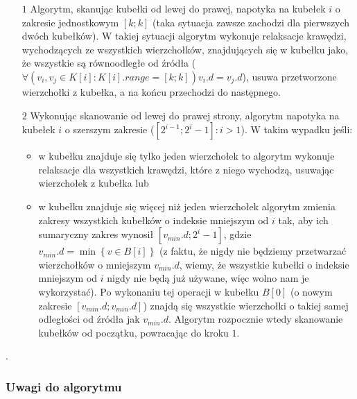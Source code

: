 \begin{itemize}
	\item[$1$] Algorytm, skanując kubełki od lewej do prawej, napotyka na kubełek $i$ o zakresie jednostkowym $\left[ k ; k \right]$ (taka sytuacja zawsze zachodzi dla pierwszych dwóch kubełków). W takiej sytuacji algorytm wykonuje relaksacje krawędzi, wychodzących ze wszystkich wierzchołków, znajdujących się w kubełku jako, że wszystkie są równoodległe od źródła ($ \forall \left( v_{i}, v_{j} \in K \left[ i \right] : K \left[ i \right].range = \left[ k ; k \right] \right) v_{i}.d = v_{j}.d $), usuwa przetworzone wierzchołki z kubełka, a na końcu przechodzi do następnego.
	\item[$2$] Wykonując skanowanie od lewej do prawej strony, algorytm napotyka na kubełek $i$ o szerszym zakresie ($ \left[ 2^{i-1} ; 2^{i} - 1 \right] : i > 1$). W takim wypadku jeśli:
	\begin{itemize}
		\item w kubełku znajduje się tylko jeden wierzchołek to algorytm wykonuje relaksacje dla wszystkich krawędzi, które z niego wychodzą, usuwając wierzchołek z kubełka lub
		\item w kubełku znajduje się więcej niż jeden wierzchołek algorytm zmienia zakresy wszystkich kubełków o indeksie mniejszym od $i$ tak, aby ich sumaryczny zakres wynosił $ \left[ v_{min}.d ; 2^{i} - 1 \right] $, gdzie $v_{min}.d = \min \left\{ v \in B \left[ i \right] \right\}$ (z faktu, że nigdy nie będziemy przetwarzać wierzchołków o mniejszym $v_{min}.d$, wiemy, że wszystkie kubełki o indeksie mniejszym od $i$ nigdy nie będą już używane, więc wolno nam je wykorzystać). Po wykonaniu tej operacji w kubełku $B \left[ 0 \right]$ (o nowym zakresie $\left[ v_{min}.d ; v_{min}.d \right]$) znajdą się wszystkie wierzchołki o takiej samej odległości od źródła jak $v_{min}.d$. Algorytm rozpocznie wtedy skanowanie kubełków od początku, powracając do kroku $1$.
	\end{itemize}
\end{itemize}.

\subsubsection{Uwagi do algorytmu}

